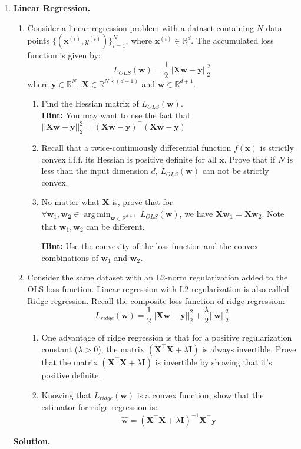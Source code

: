 \documentclass{article}
\DeclareMathOperator*{\argmin}{arg\,min}
\theoremstyle{definition}
\theoremstyle{remark}
\newenvironment{Q}
        {%
          \clearpage
          \item
        }
        {%
          \phantom{s} %
          \bigskip
          \textbf{Solution.}
        }
\begin{document}
\begin{enumerate}[font={\Large\bfseries},left=0pt]


\begin{Q}
\textbf{\Large Linear Regression.}
\begin{enumerate}
    \item Consider a linear regression problem with a dataset containing $N$ data points $\{(\bm{x}^{(i)}, y^{(i)})\}^{N}_{i=1}$,
      where $\bm{x}^{(i)} \in \mathbb{R}^d$. The accumulated loss function is given by:
      $$L_{OLS}(\bm{w}) = \frac{1}{2}||\bm{Xw} - \bm{y}||^2_2 $$
      where $\bm{y} \in \mathbb{R}^N$, $\bm{X} \in \mathbb{R}^{N \times (d+1)}$ and $\bm{w} \in \mathbb{R}^{d+1}$.
      
      \begin{enumerate}
          \item Find the Hessian matrix of $L_{OLS}(\bm{w})$.\\
          \textbf{Hint:} You may want to use the fact that  $||\bm{Xw} - \bm{y}||^2_2=(\bm{Xw} - \bm{y})^{\top}(\bm{Xw} - \bm{y})$
          \item    Recall that a twice-continuously differential function $f(\bm{x})$ is strictly convex i.f.f. its Hessian is positive definite for all $\bm{x}$. Prove that if $N$ is less than the input dimension $d$, $L_{OLS}(\bm{w})$ can not be strictly convex. 
          \item No matter what $\bm{X}$ is, prove that for $\forall \bm{w}_1, \bm{w_2}\in \argmin_{\bm{w}\in \mathbb{R}^{d+1}} \ L_{OLS}(\bm{w})$, we have $\bm{X}\bm{w_1}=\bm{X}\bm{w}_2$. Note that $\bm{w}_1,\bm{w}_2$ can be different.
          
          \textbf{Hint:} Use the convexity of the loss function and the convex combinations of $\bm{w}_1$ and $\bm{w}_2$.
      \end{enumerate}
     \item  Consider the same dataset with an L2-norm regularization added to the OLS loss function. Linear regression with L2 regularization is also called Ridge regression.
      Recall the composite loss function of ridge regression:
      $$L_{ridge}(\bm{w}) = \frac{1}{2}||\bm{Xw} - \bm{y}||^2_2 + \frac{\lambda}{2}||\bm{w}||_2^2$$
      \begin{enumerate}
      \item One advantage of ridge regression is that for a positive regularization constant ($\lambda > 0$),
      the matrix $(\bm{X}^\top\bm{X} + \lambda \bm{I})$ is always invertible. Prove that the matrix 
      $(\bm{X}^\top\bm{X} + \lambda \bm{I})$ is invertible by showing that it's positive definite.
          \item Knowing that $L_{ridge}(\bm{w})$ is a convex function, show that the estimator for ridge regression is:
        $$\hat{\bm{w}} = (\bm{X}^\top\bm{X} + \lambda \bm{I})^{-1}\bm{X}^\top\bm{y}$$
        

\end{enumerate}
\end{enumerate}
\end{Q}
\end{enumerate}
\end{document}

